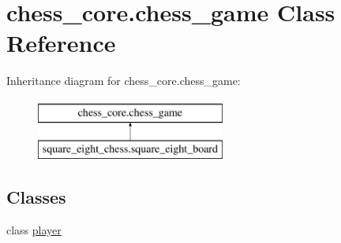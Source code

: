 \hypertarget{classchess__core_1_1chess__game}{}\section{chess\+\_\+core.\+chess\+\_\+game Class Reference}
\label{classchess__core_1_1chess__game}
Inheritance diagram for chess\+\_\+core.\+chess\+\_\+game\+:\begin{figure}[H]
\begin{center}
\leavevmode
\includegraphics[height=2.000000cm]{classchess__core_1_1chess__game}
\end{center}
\end{figure}
\subsection*{Classes}
\begin{DoxyCompactItemize}
\item 
class \hyperlink{classchess__core_1_1chess__game_1_1player}{player}
\end{DoxyCompactItemize}
